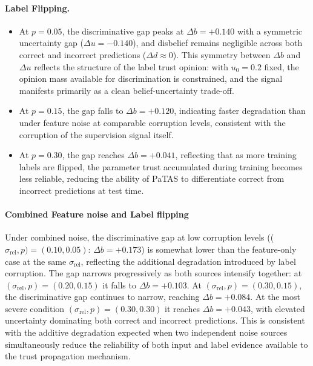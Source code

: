 \paragraph{Label Flipping.}
\begin{itemize}
    \item At $p = 0.05$, the discriminative gap peaks at $\Delta b = +0.140$ with a symmetric uncertainty gap ($\Delta u = -0.140$), and disbelief remains negligible across both correct and incorrect predictions ($\Delta d \approx 0$). This symmetry between $\Delta b$ and $\Delta u$ reflects the structure of the label trust opinion: with $u_0 = 0.2$ fixed, the opinion mass available for discrimination is constrained, and the signal manifests primarily as a clean belief-uncertainty trade-off.
    \item At $p = 0.15$, the gap falls to $\Delta b = +0.120$, indicating faster degradation than under feature noise at comparable corruption levels, consistent with the corruption of the supervision signal itself.
    \item At $p = 0.30$, the gap reaches $\Delta b = +0.041$, reflecting that as more training labels are flipped, the parameter trust accumulated during training becomes less reliable, reducing the ability of \ac{PaTAS} to differentiate correct from incorrect predictions at test time.
\end{itemize}

\paragraph{Combined Feature noise and Label flipping}
Under combined noise, the discriminative gap at low corruption levels (($\sigma_{\text{rel}}, p) = (0.10, 0.05)$: $\Delta b = +0.173$) is somewhat lower than the feature-only case at the same $\sigma_{\text{rel}}$, reflecting the additional degradation introduced by label corruption. The gap narrows progressively as both sources intensify together: at $(\sigma_{\text{rel}}, p) = (0.20, 0.15)$ it falls to $\Delta b = +0.103$. At $(\sigma_{\text{rel}}, p) = (0.30, 0.15)$, the discriminative gap continues to narrow, reaching $\Delta b = +0.084$.  At the most severe condition $(\sigma_{\text{rel}}, p) = (0.30, 0.30)$ it reaches $\Delta b = +0.043$, with elevated uncertainty dominating both correct and incorrect predictions. This is consistent with the additive degradation expected when two independent noise sources simultaneously reduce the reliability of both input and label evidence available to the trust propagation mechanism.

